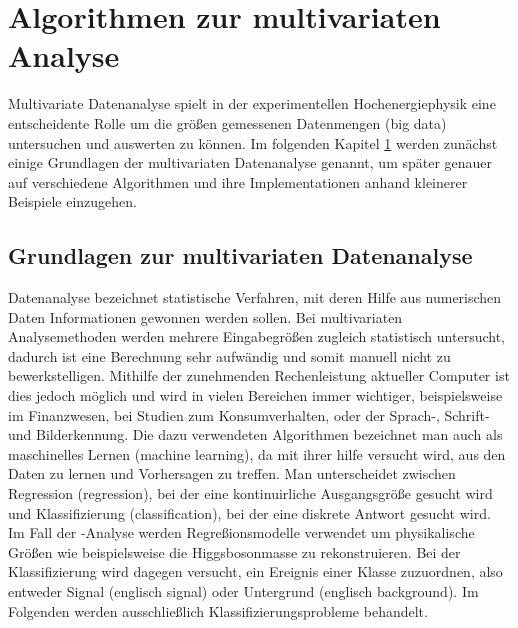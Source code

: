 \chapter{Algorithmen zur multivariaten Analyse}
\label{ch:algorithmen}

{}	%

Multivariate Datenanalyse spielt in der experimentellen Hochenergiephysik eine entscheidente Rolle um die gr\"o\ss en gemessenen Datenmengen (big data) untersuchen und auswerten zu k\"onnen. Im folgenden Kapitel \ref{ch:algorithmen} werden zun\"achst einige Grundlagen der multivariaten Datenanalyse genannt, um sp\"ater genauer auf verschiedene Algorithmen und ihre Implementationen anhand kleinerer Beispiele einzugehen.

\section{Grundlagen zur multivariaten Datenanalyse}
\label{ch:Theorie:sec:Algorithmen}

Datenanalyse bezeichnet statistische Verfahren, mit deren Hilfe aus numerischen Daten Informationen gewonnen werden sollen.
Bei multivariaten Analysemethoden werden mehrere Eingabegr\"o\ss en zugleich statistisch untersucht, dadurch ist eine Berechnung sehr aufw\"andig und somit manuell nicht zu bewerkstelligen. Mithilfe der zunehmenden Rechenleistung aktueller Computer ist dies jedoch m\"oglich und wird in vielen Bereichen immer wichtiger, beispielsweise im Finanzwesen, bei Studien zum Konsumverhalten, oder der Sprach-, Schrift- und Bilderkennung.
Die dazu verwendeten Algorithmen bezeichnet man auch als maschinelles Lernen (machine learning), da mit ihrer hilfe versucht wird, aus den Daten zu lernen und Vorhersagen zu treffen. Man unterscheidet zwischen Regression (regression), bei der eine kontinuirliche Ausgangsgr\"o\ss e gesucht wird und Klassifizierung (classification), bei der eine diskrete Antwort gesucht wird.\cite{SWB-455193959} Im Fall der \ttH-Analyse werden Regre\ss ionsmodelle verwendet um physikalische Gr\"o\ss en wie beispielsweise die Higgsbosonmasse zu rekonstruieren. Bei der Klassifizierung wird dagegen versucht, ein Ereignis einer Klasse zuzuordnen, also entweder Signal (englisch signal) oder Untergrund (englisch background). Im Folgenden werden ausschlie\ss lich Klassifizierungsprobleme behandelt.

